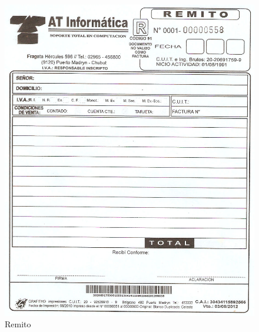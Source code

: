 \documentclass[12pt]{extarticle}
\begin{document}
    \begin{figure}[h]
    \includegraphics[scale=0.4]{images/atinformatica-remito.jpg}
    \caption{Remito}
    \end{figure}
\end{document}
